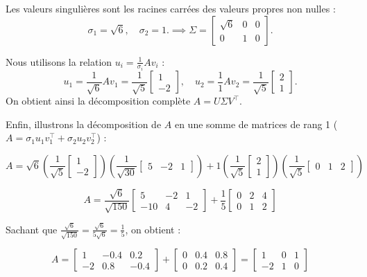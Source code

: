 \documentclass[12pt]{report}
\begin{document}
\noindent Les valeurs singulières sont les racines carrées des valeurs propres non nulles :
\[
    \sigma_1 = \sqrt{6}, \quad \sigma_2 = 1. \implies \Sigma = \begin{bmatrix} \sqrt{6} & 0 & 0 \\ 0 & 1 & 0 \end{bmatrix}.
\]

\noindent Nous utilisons la relation $u_i = \frac{1}{\sigma_i} A v_i$ :
\[
    u_1 = \frac{1}{\sqrt{6}} A v_1 = \frac{1}{\sqrt{5}} \begin{bmatrix} 1 \\ -2 \end{bmatrix}, \quad
    u_2 = \frac{1}{1} A v_2 = \frac{1}{\sqrt{5}} \begin{bmatrix} 2 \\ 1 \end{bmatrix}.
\]
On obtient ainsi la décomposition complète $A = U \Sigma V^\top$.

\noindent Enfin, illustrons la décomposition de $A$ en une somme de matrices de rang 1 ($A = \sigma_1 u_1 v_1^{\top} + \sigma_2 u_2 v_2^{\top}$) :

$$A = \sqrt{6} \left( \frac{1}{\sqrt{5}} \begin{bmatrix} 1 \\ -2 \end{bmatrix} \right) \left( \frac{1}{\sqrt{30}} \begin{bmatrix} 5 & -2 & 1 \end{bmatrix} \right) + 1 \left( \frac{1}{\sqrt{5}} \begin{bmatrix} 2 \\ 1 \end{bmatrix} \right) \left( \frac{1}{\sqrt{5}} \begin{bmatrix} 0 & 1 & 2 \end{bmatrix} \right)$$

$$A = \frac{\sqrt{6}}{\sqrt{150}} \begin{bmatrix} 5 & -2 & 1 \\ -10 & 4 & -2 \end{bmatrix} + \frac{1}{5} \begin{bmatrix} 0 & 2 & 4 \\ 0 & 1 & 2 \end{bmatrix}$$

\noindent Sachant que $\frac{\sqrt{6}}{\sqrt{150}} = \frac{\sqrt{6}}{5\sqrt{6}} = \frac{1}{5}$, on obtient :

$$A = \begin{bmatrix} 1 & -0.4 & 0.2 \\ -2 & 0.8 & -0.4 \end{bmatrix} + \begin{bmatrix} 0 & 0.4 & 0.8 \\ 0 & 0.2 & 0.4 \end{bmatrix} = \begin{bmatrix} 1 & 0 & 1 \\ -2 & 1 & 0 \end{bmatrix}$$
\end{document}
